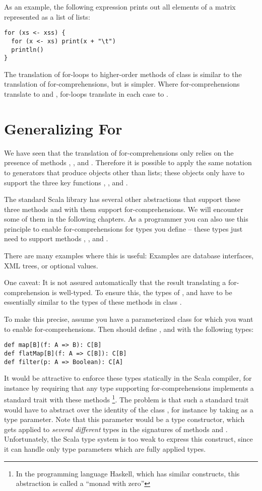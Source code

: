 {As an example, the following expression prints out all elements of a
matrix represented as a list of lists:
 \begin{lstlisting}
for (xs <- xss) {
  for (x <- xs) print(x + "\t")
  println()
}
\end{lstlisting}
The translation of for-loops to higher-order methods of class
 is similar to the translation of for-comprehensions, but
is simpler. Where for-comprehensions translate to  and
, for-loops translate in each case to .

\section{Generalizing For}

We have seen that the translation of for-comprehensions only relies on
the presence of methods , , and
. Therefore it is possible to apply the same notation to
generators that produce objects other than lists; these objects only
have to support the three key functions , ,
and .

The standard Scala library has several other abstractions that support
these three methods and with them support for-comprehensions. We will
encounter some of them in the following chapters. As a programmer you
can also use this principle to enable for-comprehensions for types you
define -- these types just need to support methods ,
, and .

There are many examples where this is useful: Examples are database
interfaces, XML trees, or optional values. 

One caveat: It is not assured automatically that the result
translating a for-comprehension is well-typed. To ensure this, the
types of ,  and  have to be
essentially similar to the types of these methods in class .

To make this precise, assume you have a parameterized class
  for which you want to enable for-comprehensions. Then
  should define ,  and 
 with the following types:
\begin{lstlisting}
def map[B](f: A => B): C[B]
def flatMap[B](f: A => C[B]): C[B]
def filter(p: A => Boolean): C[A]
\end{lstlisting}
It would be attractive to enforce these types statically in the Scala
compiler, for instance by requiring that any type supporting
for-comprehensions implements a standard trait with these methods
\footnote{In the programming language Haskell, which has similar
constructs, this abstraction is called a ``monad with zero''}.  The
problem is that such a standard trait would have to abstract over the
identity of the class , for instance by taking  as a
type parameter.  Note that this parameter would be a type constructor,
which gets applied to {\em several different} types in the signatures of
methods  and . Unfortunately, the Scala type
system is too weak to express this construct, since it can handle only
type parameters which are fully applied types.

}

